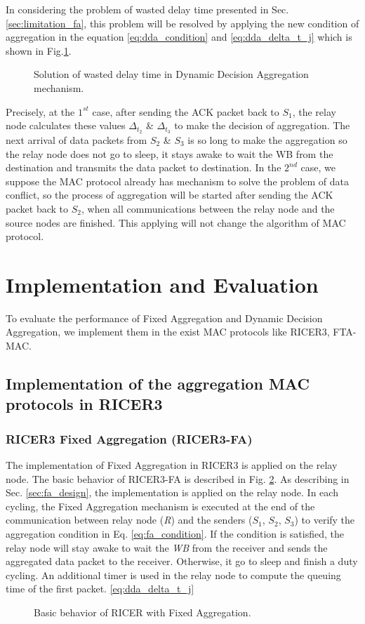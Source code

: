 In considering the problem of wasted delay time presented in Sec. \ref{sec:limitation_fa}, this problem will be resolved by applying the new condition of aggregation in the equation \ref{eq:dda_condition} and \ref{eq:dda_delta_t_j} which is shown in Fig.\ref{fig:dda_2}.
\begin{figure}[!b]
\begin{center}
\caption{Solution of wasted delay time in Dynamic Decision Aggregation mechanism.}
\label{fig:dda_2}
\end{center}
\end{figure}
Precisely, at the $1^{st}$ case, after sending the ACK packet back to $S_1$, the relay node calculates these values $\Delta_{t_2}$ \& $\Delta_{t_3}$ to make the decision of aggregation. The next arrival of data packets from $S_2$ \& $S_3$ is so long to make the aggregation so the relay node does not go to sleep, it stays awake to wait the WB from the destination and transmits the data packet to destination. In the $2^{nd}$ case, we suppose the MAC protocol already has mechanism to solve the problem of data conflict, so the process of aggregation will be started after sending the ACK packet back to $S_2$, when all communications between the relay node and the source nodes are finished. This applying will not change the algorithm of MAC protocol. 
\section{Implementation and Evaluation}
To evaluate the performance of Fixed Aggregation and Dynamic Decision Aggregation, we implement them in the exist MAC protocols like RICER3, FTA-MAC.
\subsection{Implementation of the aggregation MAC protocols in RICER3}
\subsubsection{RICER3 Fixed Aggregation (RICER3-FA)}
The implementation of Fixed Aggregation in RICER3 is applied on the relay node.
The basic behavior of RICER3-FA is described in Fig. \ref{fig:ricer_fa}. As describing in Sec. \ref{sec:fa_design}, the implementation is applied on the relay node. In each cycling, the Fixed Aggregation mechanism is executed at the end of the communication between relay node (\textit{R}) and the senders ($S_1$, $S_2$, $S_3$) to verify the aggregation condition in Eq. \ref{eq:fa_condition}. If the condition is satisfied, the relay node will stay awake to wait the \textit{WB} from the receiver and sends the aggregated data packet to the receiver. Otherwise, it go to sleep and finish a duty cycling. An additional timer is used in the relay node to compute the queuing time of the first packet. \ref{eq:dda_delta_t_j}
\begin{figure}[!b]
\begin{center}
\caption{Basic behavior of RICER with Fixed Aggregation.}
\label{fig:ricer_fa}
\end{center}
\end{figure}
